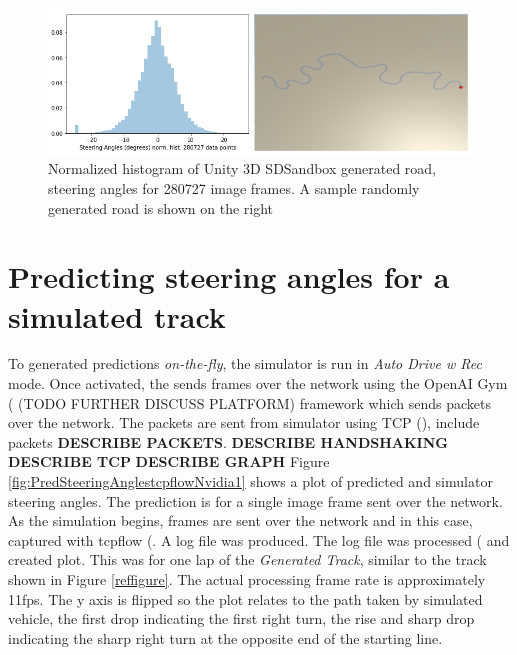 \begin{figure}[ht]
 \centering 
 \includegraphics[width=\textwidth]{Figures/GeneratedRoadPlusHistogram.png}
 \caption{Normalized histogram of Unity 3D SDSandbox generated road, steering angles for 280727 image frames. A sample randomly generated road is shown on the right}
 \label{fig:GeneratedRoadPlusHist}
\end{figure}



\section{Predicting steering angles for a simulated track}

To generated predictions \textit{on-the-fly}, the simulator is run in \textit{Auto Drive w Rec} mode. Once activated, the sends frames over the network using the OpenAI Gym (\cite{brockman2016openai} (TODO FURTHER DISCUSS PLATFORM) framework which sends packets over the network. The packets are sent from simulator using TCP (\cite{rfc793}), include packets \textbf{DESCRIBE PACKETS}.  
\textbf{DESCRIBE HANDSHAKING} \textbf{DESCRIBE TCP} 
\textbf{DESCRIBE GRAPH}
Figure \ref{fig:PredSteeringAnglestcpflowNvidia1} shows a plot of predicted and simulator steering angles. The prediction is for a single image frame sent over the network. As the simulation begins, frames are sent over the network and in this case, captured with tcpflow (\cite{garfinkel2013passive}. A log file was produced. The log file was processed (\cite{JUPYTERNOTEBOOKINAPPENDIX} and created plot. This was for one lap of the \textit{Generated Track}, similar to the track shown in Figure \ref{reffigure}. The actual processing frame rate is approximately 11fps. The y axis is flipped so the plot relates to the path taken by simulated vehicle, the first drop indicating the first right turn, the rise and sharp drop indicating the sharp right turn at the opposite end of the starting line.

